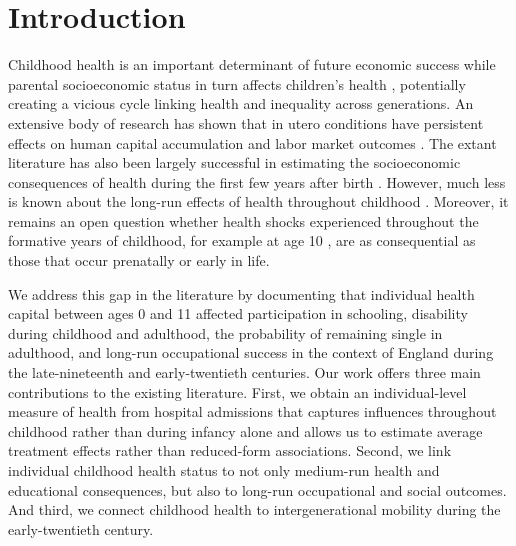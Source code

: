 \documentclass[12pt,english]{article}
\begin{document}
\FloatBarrier
\doublespacing
\renewcommand{\thefootnote}{\arabic{footnote}}

\section[Introduction]{Introduction\label{sec:Introduction}}

Childhood health is an important determinant of future economic success \citep{Currie2009} while parental socioeconomic status in turn affects children's health \citep{CaseLubotskyPaxson2002}, potentially creating a vicious cycle linking health and inequality across generations. An extensive body of research has shown that in utero conditions have persistent effects on human capital accumulation and labor market outcomes \citep{AlmondCurrie2011-JEP}. The extant literature has also been largely successful in estimating the socioeconomic consequences of health during the first few years after birth \citep{AlmondCurrie2011-HLE}. However, much less is known about the long-run effects of health throughout childhood \citep{ACD2018}. Moreover, it remains an open question whether health shocks experienced throughout the formative years of childhood, for example at age 10 \citep{Heckman2006}, are as consequential as those that occur prenatally or early in life. 

We address this gap in the literature by documenting that individual health capital between ages 0 and 11 affected participation in schooling, disability during childhood and adulthood, the probability of remaining single in adulthood, and long-run occupational success in the context of England during the late-nineteenth and early-twentieth centuries. Our work offers three main contributions to the existing literature. First, we obtain an individual-level measure of health from hospital admissions that captures influences throughout childhood rather than during infancy alone and allows us to estimate average treatment effects rather than reduced-form associations. Second, we link individual childhood health status to not only medium-run health and educational consequences, but also to long-run occupational and social outcomes. And third, we connect childhood health to intergenerational mobility during the early-twentieth century.
\end{document}
